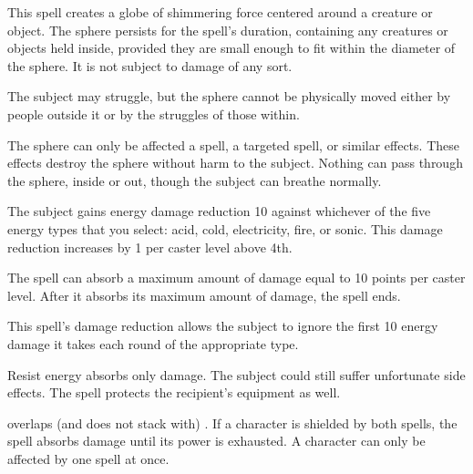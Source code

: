 \spellrng{\rngmed}
\begin{spelleffect}
  This spell creates a globe of shimmering force centered around a creature or object. The sphere persists for the spell's duration, containing any creatures or objects held inside, provided they are small enough to fit within the diameter of the sphere. It is not subject to damage of any sort.
  \par The subject may struggle, but the sphere cannot be physically moved either by people outside it or by the struggles of those within.
\end{spelleffect}
\begin{spellnotes}
  The sphere can only be affected a  spell, a targeted  spell, or similar effects. These effects destroy the sphere without harm to the subject. Nothing can pass through the sphere, inside or out, though the subject can breathe normally.
\end{spellnotes}

\begin{spelleffect}
  The subject gains energy damage reduction 10 against whichever of the five energy types that you select: acid, cold, electricity, fire, or sonic. This damage reduction increases by 1 per caster level above 4th.
  \par The spell can absorb a maximum amount of damage equal to 10 points per caster level. After it absorbs its maximum amount of damage, the spell ends.
\end{spelleffect}
\begin{spellnotes}
  This spell's damage reduction allows the subject to ignore the first 10 energy damage it takes each round of the appropriate type.

  Resist energy absorbs only damage. The subject could still suffer unfortunate side effects. The spell protects the recipient's equipment as well.
  \par {} overlaps (and does not stack with) . If a character is shielded by both spells, the  spell absorbs damage until its power is exhausted. A character can only be affected by one  spell at once.
\end{spellnotes}

